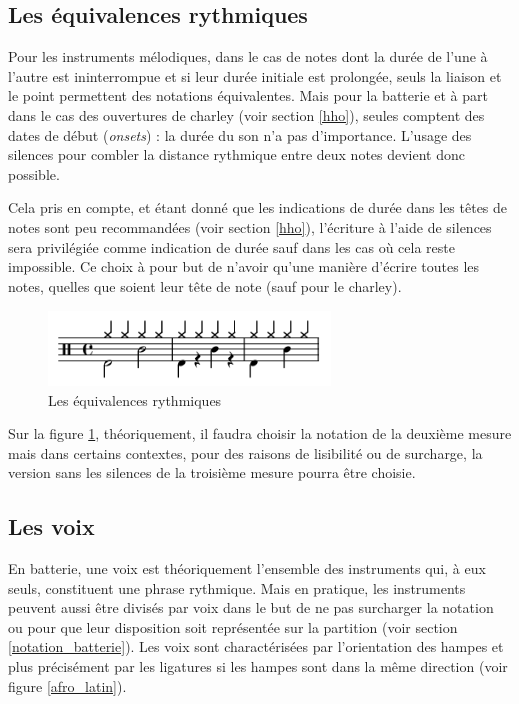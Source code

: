 \subsection*{Les équivalences rythmiques}
Pour les instruments mélodiques, dans le cas de notes dont la durée de l’une à
l’autre est ininterrompue et si leur durée initiale est prolongée, seuls la
liaison et le point permettent des notations équivalentes. Mais pour la
batterie et à part dans le cas des ouvertures de charley (voir section
\ref{hho}), seules comptent des dates de début (\textit{onsets}) : la durée du son n’a
pas d’importance. L’usage des silences pour combler la distance rythmique entre
deux notes devient donc possible.

Cela pris en compte, et étant donné que les indications de durée dans les têtes
de notes sont peu recommandées (voir section \ref{hho}), l’écriture à l’aide de
silences sera privilégiée comme indication de durée sauf dans les cas où cela
reste impossible. Ce choix à pour but de n’avoir qu’une manière d’écrire toutes
les notes, quelles que soient leur tête de note (sauf pour le charley).

\begin{figure}[h]
	\centering
	\includegraphics[height=20mm, width=75mm]{
    z_images/3_methodes/0_notation_de_la_batterie/6_equivalence.png}
	\caption{Les équivalences rythmiques}
	\label{equivalence}
\end{figure}

Sur la figure \ref{equivalence}, théoriquement, il faudra choisir la notation
de la deuxième mesure mais dans certains contextes, pour des raisons de
lisibilité ou de surcharge, la version sans les silences de la troisième mesure
pourra être choisie.

\subsection*{Les voix}


En batterie, une voix est théoriquement l’ensemble des instruments qui, à eux
seuls, constituent une phrase rythmique. Mais en pratique, les instruments
peuvent aussi être divisés par voix dans le but de ne pas surcharger la
notation ou pour que leur disposition soit représentée sur la
partition (voir section \ref{notation_batterie}).
Les voix sont charactérisées par l’orientation des hampes et plus précisément
par les ligatures si les hampes sont dans la même direction (voir figure
\ref{afro_latin}).

